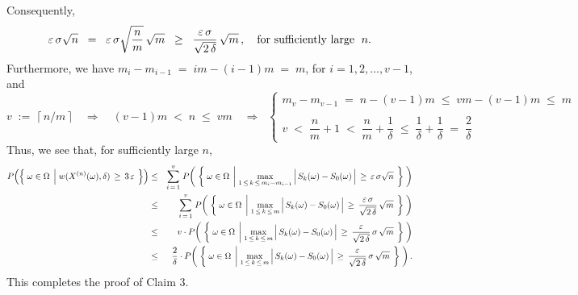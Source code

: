 Consequently,
\begin{equation*}
\varepsilon\,\sigma\sqrt{n}
\;\; = \;\;
	\varepsilon\,\sigma\sqrt{\dfrac{n}{m}}\,\sqrt{m}
\;\; \geq \;\;
	\dfrac{\varepsilon\,\sigma}{\sqrt{2\,\delta}}\,\sqrt{m}\,,
	\quad\textnormal{for sufficiently large \;$n$}.
\end{equation*}
Furthermore, we have
\;$m_{i} - m_{i-1} \;=\; im - (i-1)m \;=\; m$,\; for $i = 1, 2, \ldots, v-1$,\; and
\begin{equation*}
v \;:=\; \lceil\,n/m\,\rceil
\quad\Longrightarrow\quad
	(v-1)m \;<\; n \;\leq\; vm
\quad\Longrightarrow\;\;
	\left\{\begin{array}{l}
		m_{v} - m_{v-1} \;=\; n - (v-1)m \;\leq\; vm - (v-1)m \;\leq\; m
		\\ \\
		v \;<\; \dfrac{n}{m} + 1 \;<\; \dfrac{n}{m} + \dfrac{1}{\delta} \;\leq\; \dfrac{1}{\delta} + \dfrac{1}{\delta} \;=\; \dfrac{2}{\delta}
	\end{array}\right.
\end{equation*}
Thus, we see that, for sufficiently large $n$,
\begin{eqnarray*}
P\!\left(\left\{\;
	\omega\in\Omega
	\;\left\vert\;
		\overset{{\color{white}1}}{w}(X^{(n)}(\omega),\delta)\,\geq\,3\,\varepsilon
	\right.
\;\right\}\right)
&\leq& \overset{v}{\underset{i\,=\,1}{\sum}}\;
	P\!\left(\;\left\{\; \omega\in\Omega \;\left\vert\;
		\underset{1\,\leq\,k\,\leq\,m_{i}-m_{i-1}}{\max}
			\left\vert\, S_{k}(\omega) \overset{{\color{white}.}}{-} S_{0}(\omega) \,\right\vert
		\,\geq\,\varepsilon\,\sigma\sqrt{n}
		\right.\;\right\}
		\;\right)
\\
&\leq& \overset{v}{\underset{i\,=\,1}{\sum}}\;
	P\!\left(\;\left\{\; \omega\in\Omega \;\left\vert\;
		\underset{1\,\leq\,k\,\leq\,m}{\max}
			\left\vert\, S_{k}(\omega) \overset{{\color{white}.}}{-} S_{0}(\omega) \,\right\vert
		\,\geq\,\dfrac{\varepsilon\,\sigma}{\sqrt{2\,\delta}}\,\sqrt{m}
		\right.\;\right\}
		\;\right)
\\
&\leq&
	v \cdot
	P\!\left(\;\left\{\; \omega\in\Omega \;\left\vert\;
		\underset{1\,\leq\,k\,\leq\,m}{\max}
			\left\vert\, S_{k}(\omega) \overset{{\color{white}.}}{-} S_{0}(\omega) \,\right\vert
		\,\geq\,\dfrac{\varepsilon}{\sqrt{2\,\delta}}\,\sigma\,\sqrt{m}
		\right.\;\right\}
		\;\right)
\\
&\leq&
	\dfrac{2}{\delta} \cdot
	P\!\left(\;\left\{\; \omega\in\Omega \;\left\vert\;
		\underset{1\,\leq\,k\,\leq\,m}{\max}
			\left\vert\, S_{k}(\omega) \overset{{\color{white}.}}{-} S_{0}(\omega) \,\right\vert
		\,\geq\,\dfrac{\varepsilon}{\sqrt{2\,\delta}}\,\sigma\,\sqrt{m}
		\right.\;\right\}
		\;\right).
\end{eqnarray*}
This completes the proof of Claim 3.

